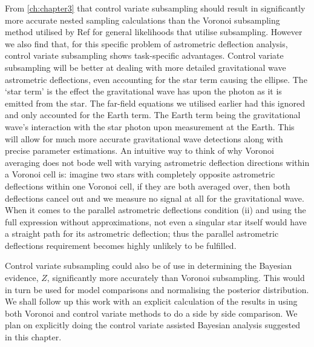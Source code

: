 From \cref{ch:chapter3} that control variate subsampling should result in significantly more accurate nested sampling calculations than the Voronoi subsampling method utilised by Ref \cite{Mihaylov_2020} for general likelihoods that utilise subsampling. However we also find that, for this specific problem of astrometric deflection analysis, control variate subsampling shows task-specific advantages. Control variate subsampling will be better at dealing with more detailed gravitational wave astrometric deflections, even accounting for the star term causing the ellipse. The `star term' is the effect the gravitational wave has upon the photon as it is emitted from the star. The far-field equations we utilised earlier had this ignored and only accounted for the Earth term. The Earth term being the gravitational wave's interaction with the star photon upon measurement at the Earth. This will allow for much more accurate gravitational wave detections along with precise parameter estimations. An intuitive way to think of why Voronoi averaging does not bode well with varying astrometric deflection directions within a Voronoi cell is: imagine two stars with completely opposite astrometric deflections within one Voronoi cell, if they are both averaged over, then both deflections cancel out and we measure no signal at all for the gravitational wave. When it comes to the parallel astrometric deflections condition (ii) and using the full expression without approximations, not even a singular star itself would have a straight path for its astrometric deflection; thus the parallel astrometric deflections requirement becomes highly unlikely to be fulfilled.

Control variate subsampling could also be of use in determining the Bayesian evidence, $Z$, significantly more accurately than Voronoi subsampling. This would in turn be used for model comparisons and normalising the posterior distribution. We shall follow up this work with an explicit calculation of the results in \cite{Mihaylov_2020} using both Voronoi and control variate methods to do a side by side comparison. We plan on explicitly doing the control variate assisted Bayesian analysis suggested in this chapter. 
